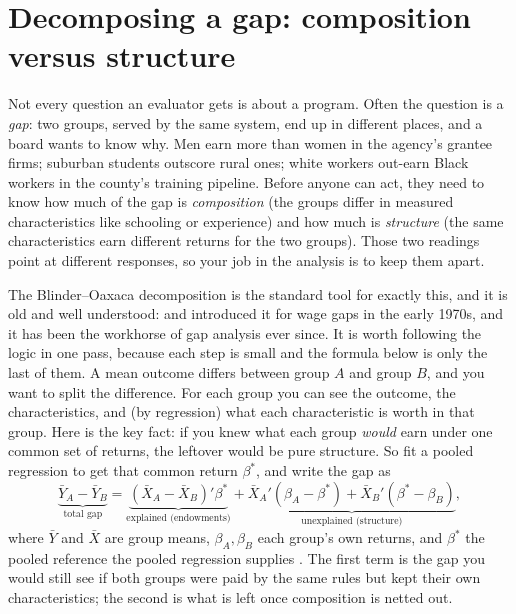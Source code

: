 \section{Decomposing a gap: composition versus structure}\label{sec:oaxaca}
Not every question an evaluator gets is about a program. Often the question is a \emph{gap}: two groups, served by the same system, end up in different places, and a board wants to know why. Men earn more than women in the agency's grantee firms; suburban students outscore rural ones; white workers out-earn Black workers in the county's training pipeline. Before anyone can act, they need to know how much of the gap is \emph{composition} (the groups differ in measured characteristics like schooling or experience) and how much is \emph{structure} (the same characteristics earn different returns for the two groups). Those two readings point at different responses, so your job in the analysis is to keep them apart.

The Blinder--Oaxaca decomposition is the standard tool for exactly this, and it is old and well understood: \textcite{blinder1973wage} and \textcite{oaxaca1973male} introduced it for wage gaps in the early 1970s, and it has been the workhorse of gap analysis ever since. It is worth following the logic in one pass, because each step is small and the formula below is only the last of them. A mean outcome differs between group $A$ and group $B$, and you want to split the difference. For each group you can see the outcome, the characteristics, and (by regression) what each characteristic is worth in that group. Here is the key fact: if you knew what each group \emph{would} earn under one common set of returns, the leftover would be pure structure. So fit a pooled regression to get that common return $\beta^\ast$, and write the gap as
\[
\underbrace{\bar Y_A-\bar Y_B}_{\text{total gap}}
=\underbrace{(\bar X_A-\bar X_B)'\beta^\ast}_{\text{explained (endowments)}}
+\underbrace{\bar X_A'(\beta_A-\beta^\ast)+\bar X_B'(\beta^\ast-\beta_B)}_{\text{unexplained (structure)}},
\]
where $\bar Y$ and $\bar X$ are group means, $\beta_A,\beta_B$ each group's own returns, and $\beta^\ast$ the pooled reference the pooled regression supplies \parencite{jann2008oaxaca}. The first term is the gap you would still see if both groups were paid by the same rules but kept their own characteristics; the second is what is left once composition is netted out.

